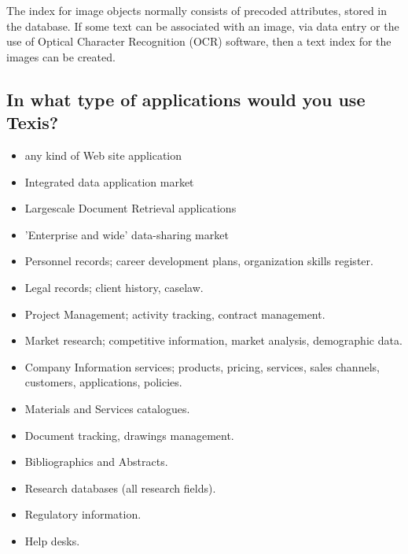 The index for image objects normally consists of precoded attributes,
stored in the database.  If some text can be associated with an image, via
data entry or the use of Optical Character Recognition (OCR) software,
then a text index for the images can be created.

\subsection{In what type of applications would you use Texis?}
\begin{itemize}

 \item        any kind of Web site application

 \item        Integrated data application market

 \item        Largescale Document Retrieval applications

 \item        'Enterprise and wide' data-sharing market

 \item        Personnel records; career development plans, organization skills register.

 \item        Legal records; client history, caselaw.

 \item        Project Management; activity tracking, contract management.

 \item        Market research; competitive information, market analysis, demographic
data.

 \item        Company Information services; products, pricing, services, sales channels,
customers, applications, policies.

 \item        Materials and Services catalogues.

 \item        Document tracking, drawings management.

 \item        Bibliographics and Abstracts.

 \item        Research databases (all research fields).

 \item        Regulatory information.

 \item        Help desks.
\end{itemize}


